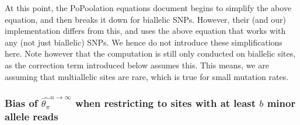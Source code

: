 \documentclass[a4paper,fontsize=9pt,DIV=14]{scrartcl}
\newcounter{todo}
\newcounter{popoolissue}
\newcommand\todo[1]{{\stepcounter{todo}\color{purple}{TODO \arabic{todo}: #1}}}
\newcommand\popoolissue[1]{}
\newcommand{\samplesize}{n}
\newcommand{\thetapi}{\widehat{\theta_\pi}}
\begin{document}
At this point, the PoPoolation equations document begins to simplify the above equation, and then breaks it down for biallelic SNPs. However, their (and our) implementation differs from this, and uses the above equation that works with any (not just biallelic) SNPs. We hence do not introduce these simplifications here.
Note however that the computation is still only conducted on biallelic sites, as the correction term introduced below assumes this. This means, we are assuming that multiallelic sites are rare, which is true for small mutation rates.

\popoolissue{We think that it is makes sense to compute only on biallelic SNPs, as this is a theoretical derivation of $4N_e\mu$, which assumes the infinitesimal model (which does not allow for multi-allelic loci). Still, we briefly wanted to check in with you here. Our guess is that the computation in code is just done for all four nucleotides to keep the code simple -- but the function only gets called for biallelic sites, so it behaves as if it was only computed for biallelic SNPs. Is that right?}



\subsubsection*{Bias of $\thetapi^{\samplesize\to\infty}$ when restricting to sites with at least $b$ minor allele reads}
\label{supp:sec:ThetaPi:sub:PoolSequencing:sub:ExpectedValue}
\end{document}
